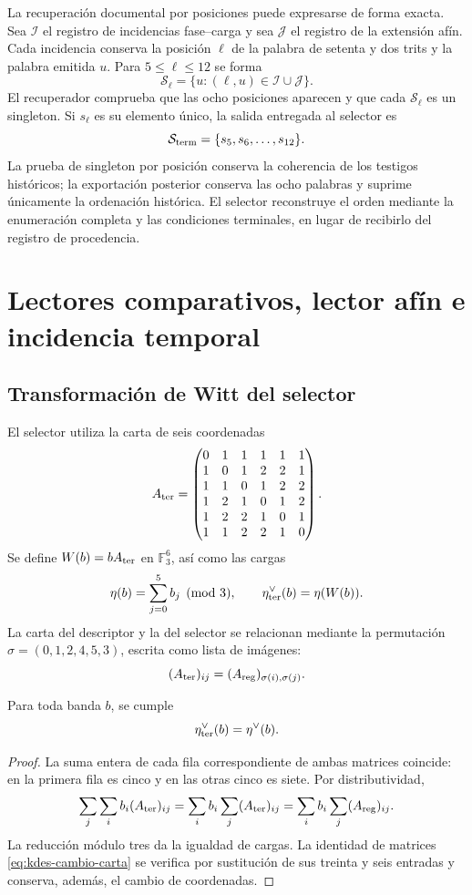 La recuperación documental por posiciones puede expresarse de forma
exacta. Sea $\mathcal I$ el registro de incidencias fase--carga y sea
$\mathcal J$ el registro de la extensión afín. Cada incidencia conserva
la posición $\ell$ de la palabra de setenta y dos trits y la palabra
emitida $u$. Para $5\leq\ell\leq12$ se forma
\[
 \mathcal S_\ell=
 \{u:(\ell,u)\in\mathcal I\cup\mathcal J\}.
\]
El recuperador comprueba que las ocho posiciones aparecen y que cada
$\mathcal S_\ell$ es un singleton. Si $s_\ell$ es su elemento único,
la salida entregada al selector es
\[
 \mathcal S_{\rm term}=\{s_5,s_6,\ldots,s_{12}\}.
\]
La prueba de singleton por posición conserva la coherencia de los
testigos históricos; la exportación posterior conserva las ocho
palabras y suprime únicamente la ordenación histórica. El selector
reconstruye el orden mediante la enumeración completa y las condiciones
terminales, en lugar de recibirlo del registro de procedencia.

\section{Lectores comparativos, lector afín e incidencia temporal}

\subsection{Transformación de Witt del selector}

El selector utiliza la carta de seis coordenadas
\[
 A_{\rm ter}=
 \begin{pmatrix}
 0&1&1&1&1&1\\
 1&0&1&2&2&1\\
 1&1&0&1&2&2\\
 1&2&1&0&1&2\\
 1&2&2&1&0&1\\
 1&1&2&2&1&0
 \end{pmatrix}.
\]
Se define $W(b)=bA_{\rm ter}$ en $\mathbb F_3^6$, así como las cargas
\[
 \eta(b)=\sum_{j=0}^5 b_j\pmod3,
 \qquad\eta_{\rm ter}^\vee(b)=\eta(W(b)).
\]
La carta del descriptor y la del selector se relacionan mediante la
permutación $\sigma=(0,1,2,4,5,3)$, escrita como lista de imágenes:
\begin{equation}
 (A_{\rm ter})_{ij}=(A_{\rm reg})_{\sigma(i),\sigma(j)}.
 \label{eq:kdes-cambio-carta}
\end{equation}

\begin{lemma}
Para toda banda $b$, se cumple
\[
 \eta_{\rm ter}^\vee(b)=\eta^\vee(b).
\]
\end{lemma}
\begin{proof}
La suma entera de cada fila correspondiente de ambas matrices coincide:
en la primera fila es cinco y en las otras cinco es siete. Por
distributividad,
\[
 \sum_j\sum_i b_i(A_{\rm ter})_{ij}
 =\sum_i b_i\sum_j(A_{\rm ter})_{ij}
 =\sum_i b_i\sum_j(A_{\rm reg})_{ij}.
\]
La reducción módulo tres da la igualdad de cargas. La identidad de
matrices \eqref{eq:kdes-cambio-carta} se verifica por sustitución de sus
treinta y seis entradas y conserva, además, el cambio de coordenadas.
\end{proof}


